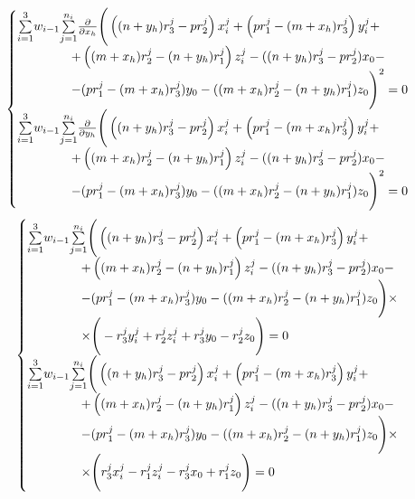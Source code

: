 $$\begin{gathered}
	\begin{cases}
		 \underset{i=1}{\overset{3}{\sum}}w_{i-1}\underset{j=1}{\overset{n_i}{\sum}} \frac{\partial}{\partial x_h} \Bigg( \left( (n+y_h)r_3^j - p r_2^j \right)x_i^j + \left( p r_1^j - (m+x_h) r_3^j \right)y_i^j + \\
		\hspace{1.5cm} + \left( (m+x_h)r_2^j - (n+y_h)r_1^j \right) z_i^j - ((n + y_h) r_3^j - p r_2^j) x_0 - \\
		\hspace{1.5cm} - (p r_1^j - (m + x_h) r_3^j) y_0 - ((m + x_h) r_2^j - (n + y_h) r_1^j) z_0 \Bigg)^2 = 0 \\
		\underset{i=1}{\overset{3}{\sum}}w_{i-1}\underset{j=1}{\overset{n_i}{\sum}} \frac{\partial}{\partial y_h} \Bigg( \left( (n+y_h)r_3^j - p r_2^j \right)x_i^j + \left( p r_1^j - (m+x_h) r_3^j \right)y_i^j + \\
		\hspace{1.5cm} + \left( (m+x_h)r_2^j - (n+y_h)r_1^j \right) z_i^j - ((n + y_h) r_3^j - p r_2^j) x_0 - \\
		\hspace{1.5cm} - (p r_1^j - (m + x_h) r_3^j) y_0 - ((m + x_h) r_2^j - (n + y_h) r_1^j) z_0 \Bigg)^2 = 0
	\end{cases}
\end{gathered}$$
$$\begin{gathered}
	\begin{cases}
		\underset{i=1}{\overset{3}{\sum}}w_{i-1}\underset{j=1}{\overset{n_i}{\sum}} \Bigg( \left( (n+y_h)r_3^j - p r_2^j \right)x_i^j + \left( p r_1^j - (m+x_h) r_3^j \right)y_i^j + \\
		\hspace{1.5cm} + \left( (m+x_h)r_2^j - (n+y_h)r_1^j \right) z_i^j - ((n + y_h) r_3^j - p r_2^j) x_0 - \\
		\hspace{1.5cm} - (p r_1^j - (m + x_h) r_3^j) y_0 - ((m + x_h) r_2^j - (n + y_h) r_1^j) z_0 \Bigg) \times \\
		\hspace{1.5cm} \times \Bigg( - r_3^j y_i^j + r_2^j z_i^j + r_3^j y_0 - r_2^j z_0 \Bigg) = 0 \\
		\underset{i=1}{\overset{3}{\sum}}w_{i-1}\underset{j=1}{\overset{n_i}{\sum}} \Bigg( \left( (n+y_h)r_3^j - p r_2^j \right)x_i^j + \left( p r_1^j - (m+x_h) r_3^j \right)y_i^j + \\
		\hspace{1.5cm} + \left( (m+x_h)r_2^j - (n+y_h)r_1^j \right) z_i^j - ((n + y_h) r_3^j - p r_2^j) x_0 - \\
		\hspace{1.5cm} - (p r_1^j - (m + x_h) r_3^j) y_0 - ((m + x_h) r_2^j - (n + y_h) r_1^j) z_0 \Bigg) \times \\
		\hspace{1.5cm} \times \Bigg( r_3^j x_i^j - r_1^j z_i^j - r_3^j x_0 + r_1^j z_0 \Bigg) = 0 
	\end{cases}
\end{gathered}$$


